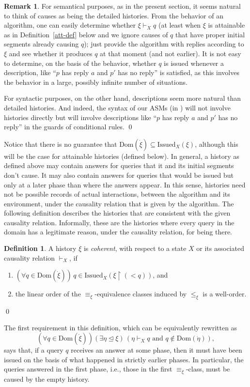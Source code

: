 \documentclass{LMCS}
\theoremstyle{definition}
\newtheorem{df}[thm]{Definition}
\newtheorem{rmk}[thm]{Remark}
\newenvironment{lsnum}{\begin{enumerate}}{\end{enumerate}}
\newcommand{\ans}{\dot}
\newcommand{\dom}[1]{\ensuremath{{\text{Dom}}(#1)}}
\newcommand{\restr}{\mathop{\upharpoonright}}
\newcommand{\Issued}{\text{Issued}}
\newcommand{\initeq}{\unlhd}
\begin{document}
\begin{rmk}
For semantical purposes, as in the present section, it seems natural
to think of causes as being the detailed histories.  From the behavior
of an algorithm, one can easily determine whether $\xi\vdash_Xq$ (at
least when $\xi$ is attainable as in Definition~\ref{att-def} below
and we ignore causes of $q$ that have proper initial segments already
causing $q$); just provide the algorithm with replies according to
$\xi$ and see whether it produces $q$ at that moment (and not
earlier).  It is not easy to determine, on the basis of the behavior,
whether $q$ is issued whenever a description, like ``$p$ has reply $a$
and $p'$ has no reply'' is satisfied, as this involves the behavior in
a large, possibly infinite number of situations.

For syntactic purposes, on the other hand, descriptions seem more
natural than detailed histories.  And indeed, the syntax of our ASMs
(in \cite{ga2}) will not involve histories directly but will involve
descriptions like ``$p$ has reply $a$ and $p'$ has no reply'' in the
guards of conditional rules. \qed\end{rmk}

Notice that there is no guarantee that
$\dom{\ans\xi}\subseteq\Issued_X(\xi)$, although this will be the case
for attainable histories (defined below).  In general, a history as
defined above may contain answers for queries that it and its initial
segments don't cause.  It may also contain answers for queries that
would be issued but only at a later phase than where the answers
appear.  In this sense, histories need not be possible records of
actual interactions, between the algorithm and its environment, under
the causality relation that is given by the algorithm.  The following
definition describes the histories that are consistent with the given
causality relation.  Informally, these are the histories where every
query in the domain has a legitimate reason, under the causality
relation, for being there.

\begin{df}
  A history $\xi$ is \emph{coherent}, with respect to a state
  $X$ or its associated causality relation $\vdash_X$, if
  \begin{lsnum}
    \item $(\forall q\in\dom{\ans\xi})\,q\in\Issued_X(\xi\restr(<q))$,
    and
    \item the linear order of the $\equiv_\xi$-equivalence classes
    induced by $\leq_\xi$ is a well-order.
  \end{lsnum}
\qed\end{df}
The first requirement in this definition, which can be equivalently
rewritten as
$$
(\forall q\in\dom{\ans\xi})(\exists\eta\initeq\xi)\,
(\eta\vdash_Xq\text{ and }q\notin\dom{\ans\eta}),
$$
says that, if a query $q$ receives an answer at some phase, then it
must have been issued on the basis of what happened in strictly earlier
phases.  In particular, the queries answered in the first phase, i.e.,
those in the first $\equiv_\xi$-class, must be caused by the empty
history.
\end{document}
